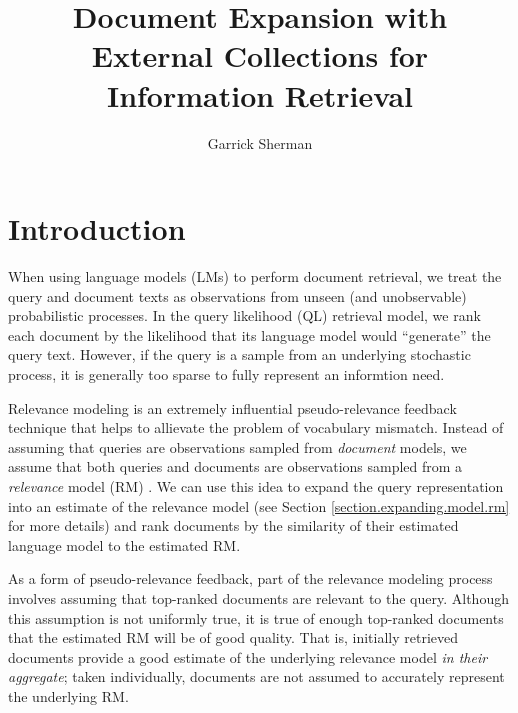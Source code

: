 \documentclass{article}
\begin{document}
\author{Garrick Sherman}

\title{Document Expansion with External Collections for Information Retrieval}

\maketitle
\begin{abstract}
\end{abstract}

\section{Introduction}\label{section.intro}

When using language models (LMs) to perform document retrieval, we treat the query and document texts as observations from unseen (and unobservable) probabilistic processes. In the query likelihood (QL) retrieval model, we rank each document by the likelihood that its language model would ``generate'' the query text. However, if the query is a sample from an underlying stochastic process, it is generally too sparse to fully represent an informtion need.

Relevance modeling is an extremely influential pseudo-relevance feedback technique that helps to allievate the problem of vocabulary mismatch. Instead of assuming that queries are observations sampled from \textit{document} models, we assume that both queries and documents are observations sampled from a \textit{relevance} model (RM) \cite{Lavrenko2001}. We can use this idea to expand the query representation into an estimate of the relevance model (see Section \ref{section.expanding.model.rm} for more details) and rank documents by the similarity of their estimated language model to the estimated RM.

As a form of pseudo-relevance feedback, part of the relevance modeling process involves assuming that top-ranked documents are relevant to the query. Although this assumption is not uniformly true, it is true of enough top-ranked documents that the estimated RM will be of good quality. That is, initially retrieved documents provide a good estimate of the underlying relevance model \textit{in their aggregate}; taken individually, documents are not assumed to accurately represent the underlying RM.

\end{document}
